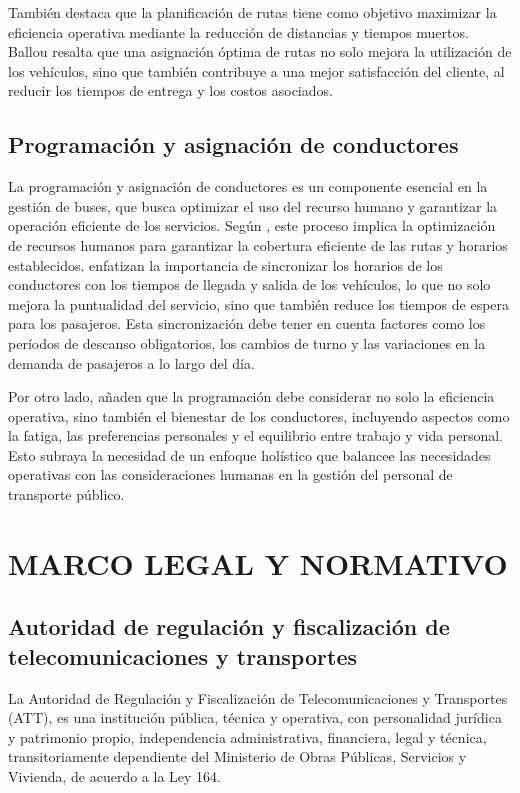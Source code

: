 		También \textcite{ballou2004logistica} destaca que la planificación de rutas tiene como objetivo maximizar la eficiencia operativa mediante la reducción de distancias y tiempos muertos. Ballou resalta que una asignación óptima de rutas no solo mejora la utilización de los vehículos, sino que también contribuye a una mejor satisfacción del cliente, al reducir los tiempos de entrega y los costos asociados.
	\subsection{Programación y asignación de conductores}
		La programación y asignación de conductores es un componente esencial en la gestión de buses, que busca optimizar el uso del recurso humano y garantizar la operación eficiente de los servicios. Según \textcite{mauttone2002diseno}, este proceso implica la optimización de recursos humanos para garantizar la cobertura eficiente de las rutas y horarios establecidos. \textcite{ibarra2012synchronization} enfatizan la importancia de sincronizar los horarios de los conductores con los tiempos de llegada y salida de los vehículos, lo que no solo mejora la puntualidad del servicio, sino que también reduce los tiempos de espera para los pasajeros. Esta sincronización debe tener en cuenta factores como los períodos de descanso obligatorios, los cambios de turno y las variaciones en la demanda de pasajeros a lo largo del día.
		
		Por otro lado, \textcite{molinero2005transporte} añaden que la programación debe considerar no solo la eficiencia operativa, sino también el bienestar de los conductores, incluyendo aspectos como la fatiga, las preferencias personales y el equilibrio entre trabajo y vida personal. Esto subraya la necesidad de un enfoque holístico que balancee las necesidades operativas con las consideraciones humanas en la gestión del personal de transporte público.	
	
	\section{MARCO LEGAL Y NORMATIVO}
	\subsection{Autoridad de regulación y fiscalización de telecomunicaciones y transportes}
	La Autoridad de Regulación y Fiscalización de Telecomunicaciones y Transportes
	(ATT), es una institución pública, técnica y operativa, con personalidad jurídica y patrimonio propio, independencia administrativa, financiera, legal y técnica, transitoriamente dependiente del Ministerio de Obras Públicas, Servicios y Vivienda, de acuerdo a la Ley 164.
	
